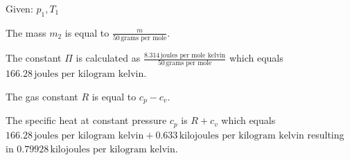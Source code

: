 Given: \( p_1, T_1 \)

The mass \( m_2 \) is equal to \( \frac{m}{50 \, \text{grams per mole}} \).

The constant \( \Pi \) is calculated as \( \frac{8.314 \, \text{joules per mole kelvin}}{50 \, \text{grams per mole}} \) which equals \( 166.28 \, \text{joules per kilogram kelvin} \).

The gas constant \( R \) is equal to \( c_p - c_v \).

The specific heat at constant pressure \( c_p \) is \( R + c_v \) which equals \( 166.28 \, \text{joules per kilogram kelvin} + 0.633 \, \text{kilojoules per kilogram kelvin} \) resulting in \( 0.79928 \, \text{kilojoules per kilogram kelvin} \).
